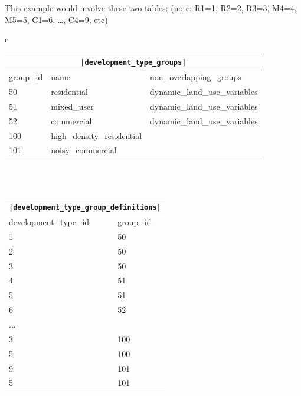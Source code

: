 This example would involve these two tables: (note: R1=1, R2=2, R3=3,
M4=4, M5=5, C1=6, \ldots, C4=9, etc)

\begin{center}
\begin{tabular}{c}

\begin{tabular}{|l|l|l|}
\multicolumn{3}{c}{\textbf{\tt|development_type_groups|}} \\
\hline
group_id & name & non_overlapping_groups \\

\hline
50 &residential &dynamic_land_use_variables \\

\hline
51 &mixed_user &dynamic_land_use_variables \\

\hline
52 &commercial &dynamic_land_use_variables \\

\hline
100 &high_density_residential & \\

\hline
101 &noisy_commercial & \\

\hline
\end{tabular}

\\ \\

\begin{tabular}{|l|l|}
\multicolumn{2}{c}{\textbf{\tt|development_type_group_definitions|}} \\

\hline
development_type_id & group_id \\

\hline
1 & 50 \\
\hline
2 & 50 \\
\hline
3 & 50 \\
\hline
4 & 51 \\
\hline
5 & 51 \\
\hline
6 & 52 \\
\hline
... &  \\
\hline
3 & 100 \\
\hline
5 & 100 \\
\hline
9 & 101 \\
\hline
5 & 101 \\
\hline
\end{tabular}

\end{tabular}
\end{center}


